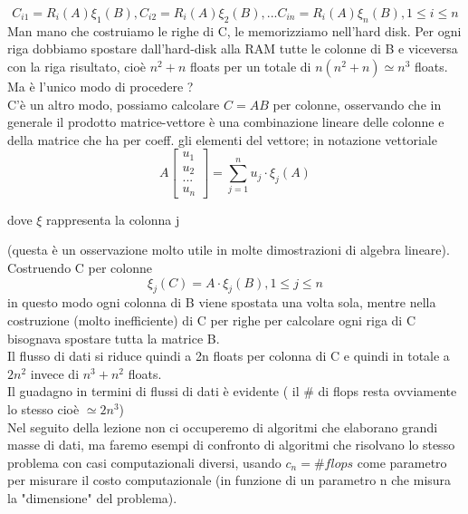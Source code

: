 \documentclass[12pt]{article}
\begin{document}
\begin{equation*}
    C_{i1} = R_i(A)\xi_1(B),C_{i2} = R_i(A)\xi_2(B), ... C_{in} = R_i(A)\xi_n(B), 1 \leq i \leq n
\end{equation*}
Man mano che costruiamo le righe di C, le memorizziamo nell'hard disk. 
Per ogni riga dobbiamo spostare dall'hard-disk alla RAM tutte le colonne di B e viceversa con la riga risultato, cioè $n^2+n$ floats per un totale di $n(n^2+n) \simeq n^3$ floats. Ma è l'unico modo di procedere ? \\
C'è un altro modo, possiamo calcolare $C=AB$ per colonne, osservando che in generale il prodotto matrice-vettore è una combinazione lineare delle colonne e della matrice che ha per coeff. gli elementi del vettore; in notazione vettoriale \\
\begin{equation*}
   A\left[\begin{matrix} u_1 \\ u_2 \\ ... \\ u_n \end{matrix}\right] = \sum_{j=1}^{n} u_j \cdot \xi_j  (A) 
\end{equation*}
\begin{center}
dove $\xi$ rappresenta la colonna j\\
\end{center}
(questa è un osservazione molto utile in molte dimostrazioni di algebra lineare).
\\
Costruendo C per colonne \\
\begin{equation*}
    \xi_j(C) = A\cdot \xi_j(B), 1 \leq j \leq n
\end{equation*}
in questo modo ogni colonna di B viene spostata una volta sola, mentre nella costruzione (molto inefficiente) di C per righe per calcolare ogni riga di C bisognava spostare tutta la matrice B.\\
Il flusso di dati si riduce quindi a 2n floats per colonna di C e quindi in totale a $2n^2$ invece di $n^3+n^2$ floats.\\
Il guadagno in termini di flussi di dati è evidente ( il \# di flops resta ovviamente lo stesso cioè $\simeq 2n^3$)\\
Nel seguito della lezione non ci occuperemo di algoritmi che elaborano grandi masse di dati, ma faremo esempi di confronto di algoritmi che risolvano lo stesso problema con casi computazionali diversi, usando $c_n = \# flops$ come parametro per misurare il costo computazionale (in funzione di un parametro n che misura la "dimensione" del problema). \\
\end{document}
